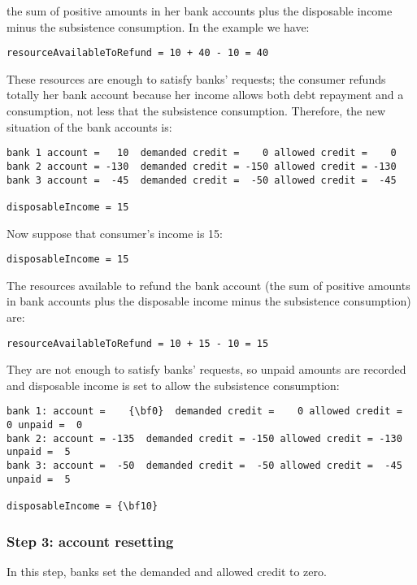 \documentclass{article}
\begin{document}
the sum of positive amounts in her bank accounts plus the disposable income minus the subsistence consumption. In the example we have:

\verb/resourceAvailableToRefund = 10 + 40 - 10 = 40/

These resources are enough to satisfy banks' requests; the consumer refunds totally her bank account because her income allows both debt repayment and a consumption, not less that the subsistence consumption. 
Therefore, the new situation of the bank accounts is:

\begin{verbatim}
bank 1 account =   10  demanded credit =    0 allowed credit =    0
bank 2 account = -130  demanded credit = -150 allowed credit = -130 
bank 3 account =  -45  demanded credit =  -50 allowed credit =  -45

disposableIncome = 15
\end{verbatim}



Now suppose that consumer's income is 15:

\verb+disposableIncome = 15+

The resources available to refund the bank account (the sum of positive amounts in bank accounts plus the disposable income minus the subsistence consumption) are:

\verb/resourceAvailableToRefund = 10 + 15 - 10 = 15/

They are not enough to satisfy banks' requests, so unpaid amounts are recorded and disposable income is set to allow the subsistence consumption:

\begin{Verbatim}[commandchars=\\\{\}]
bank 1: account =    {\bf0}  demanded credit =    0 allowed credit =    0 unpaid =  0
bank 2: account = -135  demanded credit = -150 allowed credit = -130 unpaid =  5
bank 3: account =  -50  demanded credit =  -50 allowed credit =  -45 unpaid =  5

disposableIncome = {\bf10}
\end{Verbatim}

\subsubsection*{Step 3: account resetting}
In this step, banks set the demanded and allowed credit to zero.
\end{document}
